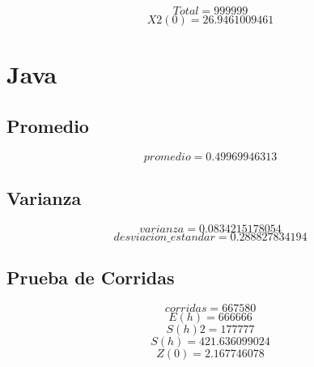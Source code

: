 \documentclass{article}
\begin{document}
$$
Total = 999999
$$
$$
X2(0) = 26.9461009461
$$
\section{Java}


\subsection{Promedio}
$$
promedio = 0.49969946313
$$


\subsection{Varianza}
$$
varianza = 0.0834215178054
$$
$$
desviacion\_estandar = 0.288827834194
$$


\subsection{Prueba de Corridas}
$$
corridas = 667580
$$
$$
E(h) = 666666
$$
$$
S(h)2 = 177777
$$
$$
S(h) = 421.636099024
$$
$$
Z(0) = 2.167746078
$$
\end{document}
